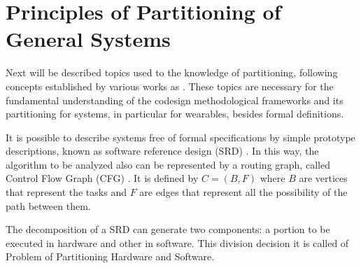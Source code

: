 \section{Principles of Partitioning of General Systems} \label{chap:design}
    
    Next will be described topics used to the knowledge of partitioning, following concepts established by various works as \cite{Arato2003, Arato2005, Mann2007, BenHajHassine2017, Sass2010}.
    These topics are necessary for the fundamental understanding of the codesign methodological frameworks and its partitioning for systems, in particular for wearables, besides formal definitions.
    
    It is possible to describe systems free of formal specifications by simple prototype descriptions, known as software reference design (SRD) \cite{Sass2010}.
    In this way, the algorithm to be analyzed also can be represented by a routing graph, called Control Flow Graph (CFG) \cite{Mann2007}.
    It is defined by $C = (B, F) \label{eq:subrotina}$ where $B$ are vertices that represent the tasks and $ F $ are edges that represent all the possibility of the path between them.
    
    
    The decomposition of a SRD can generate two components: a portion to be executed in hardware and other in software.
    This division decision it is called of Problem of Partitioning Hardware and Software.
    
